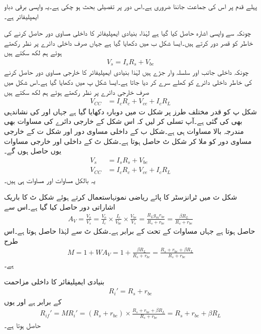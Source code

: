 پہلے قدم پر اس کی جماعت جاننا ضروری ہے۔اس دور پر تفصیلی بحث ہو چکی ہے۔یہ واپسی برقی دباو ایمپلیفائر ہے۔

چونکہ  سے واپسی اشارہ حاصل کیا گیا ہے لہٰذا، بنیادی ایمپلیفائر کا داخلی مساوی دور حاصل کرنے کی خاطر  کو قصر دور کرتے ہیں۔ایسا شکل  ب میں دکھایا گیا ہے جہاں صرف داخلی دائرے پر نظر رکھتے ہوئے ہم لکھ سکتے ہیں
\begin{align} \label{مساوات_واپسی_برقی_دباو_داخلی_مساوی}
V_s = I_s R_s +V_{be}
\end{align}
چونکہ داخلی جانب  اور  سلسلہ وار جڑے ہیں لہٰذا بنیادی ایمپلیفائر کا خارجی مساوی دور حاصل کرنے کی خاطر داخلی دائرے کو کھلے سرے کر دیا جاتا ہے۔ایسا شکل  پ میں دکھایا گیا ہے۔اس شکل میں صرف خارجی دائرے پر نظر رکھتے ہوئے ہم لکھ سکتے ہیں
\begin{align} \label{مساوات_واپسی_برقی_دباو_خارجی_مساوی}
V_{CC} &= I_c R_c+V_{ce}+I_c R_L 
\end{align}
شکل  پ کو قدر مختلف طرز پر شکل  ت میں دوبارہ دکھایا گیا ہے جہاں  اور  کی نشاندہی بھی کی گئی ہے۔آپ تسلی کر لیں کہ اس شکل کے 
خارجی دائرے کی مساوات  بھی مندرجہ بالا مساوات ہی ہے۔شکل  ب کے داخلی مساوی دور اور شکل  ت کے خارجی مساوی دور کو ملا کر شکل  ٹ حاصل ہوتا ہے۔شکل  ٹ کے داخلی اور خارجی مساوات یوں حاصل ہوں گے۔
\begin{align}
V_s &= I_s R_s +V_{be}\\
V_{CC} &= I_c R_c+V_{ce}+I_c R_L
\end{align}
یہ بالکل مساوات  اور مساوات  ہی ہیں۔

شکل  ث میں ٹرانزسٹر کا پائے ریاضی نمونہاستعمال کرتے ہوئے شکل  ٹ کا باریک اشاراتی دور حاصل کیا گیا ہے۔اس سے
\begin{align} \label{مساوات_واپسی_ٹرانزسٹر_تابع_مخارج_افزائش}
A_V=\frac{V_o}{V_s}=\frac{V_o}{I_c} \times \frac{I_c}{V_{be}} \times \frac{V_{be}}{V_s}=\frac{R_L g_m r_{be}}{R_s+r_{be}}=\frac{\beta R_L}{R_s+r_{be}}
\end{align}
حاصل ہوتا ہے جہاں مساوات  کے تحت  کے برابر ہے۔شکل  ٹ سے    لہٰذا  حاصل ہوتا ہے۔اس طرح
\begin{align}
M=1+W A_V=1+\frac{\beta R_L}{R_s+r_{be}}=\frac{R_s+r_{be}+\beta R_L}{R_s+r_{be}}
\end{align}
ہے۔

بنیادی ایمپلیفائر کا داخلی مزاحمت
\begin{align}
R_i'=R_s+r_{be}
\end{align}
کے برابر ہے اور یوں
\begin{align}
R_{if}'=M R_i' =\left (R_s+r_{be} \right) \times \frac{R_s+r_{be}+\beta R_L}{R_s+r_{be}}=R_s+r_{be}+\beta R_L
\end{align}
حاصل ہوتا ہے۔

